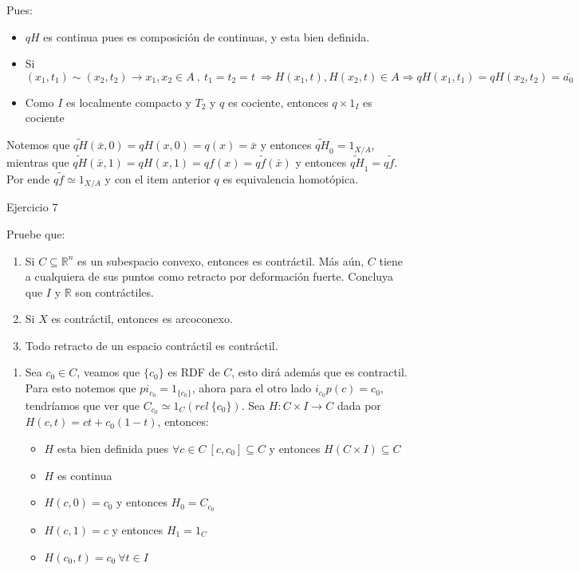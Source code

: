 \documentclass[11pt]{article}
\newcommand{\R}{{\mathbb{R}}}
\newenvironment{proof}[1][Demostraci\'on]{\begin{trivlist}
\item[\hskip \labelsep {\bfseries #1}]}{\end{trivlist}}
\newcommand{\qed}{\nobreak \ifvmode \relax \else
      \ifdim\lastskip<1.5em \hskip-\lastskip
      \hskip1.5em plus0em minus0.5em \fi \nobreak
      \vrule height0.75em width0.5em depth0.25em\fi}
\def \be{\begin{enumerate}}
\def \en{\end{enumerate}}
\begin{document}
\begin{enumerate}
\begin{proof}
\begin{itemize}
Pues:

\begin{itemize}
\item $qH$ es continua pues es composici\'on de continuas, y esta bien definida.
\item Si $(x_1,t_1) \sim (x_2,t_2) \rightarrow x_1,x_2 \in A \ , \ t_1=t_2=t \ \Longrightarrow H(x_1,t),H(x_2,t) \in A \Longrightarrow qH(x_1,t_1)=qH(x_2,t_2)=\bar{a_0} $
\item Como $I$ es localmente compacto y $T_2$ y $q$ es cociente, entonces $q \times 1_I$ es cociente
\end{itemize}

Notemos que $\tilde{qH}(\bar{x},0) = qH(x,0)=q(x) = \bar{x}$ y entonces $\tilde{qH}_0 = 1_{X/A}$, mientras que $\tilde{qH}(\bar{x},1)=qH(x,1)=qf(x)=q\tilde{f}(\bar{x})$ y entonces $\tilde{qH}_1 = q\tilde{f}$. Por ende $q\tilde{f} \simeq 1_{X/A}$ y con el item anterior $q$ es equivalencia homot\'opica. \qed

\end{itemize}


\end{proof}

\item{Ejercicio 7}

Pruebe que: 
\be
 \item Si $C\subseteq \R^ n$ es un subespacio convexo, entonces es contr\'actil. M\'as a\'un, $C$ tiene a cualquiera de
sus puntos como retracto por deformaci\'on fuerte.
 Concluya que $I$ y $\R$ son contr\'actiles.
 
 \item Si $X$ es contr\'actil, entonces es arcoconexo.
 
 \item Todo retracto de un espacio contr\'actil es contr\'actil.
 \en

\begin{proof}

\begin{enumerate}
\item Sea $c_0 \in C$, veamos que $\{c_0\}$ es RDF de $C$, esto dir\'a adem\'as que es contractil. Para esto notemos que $pi_{c_0}=1_{\{c_0\}}$, ahora para el otro lado $i_{c_0}p(c)=c_0$, tendr\'iamos que ver que $C_{c_0} \simeq 1_{C} (rel \ \{c_0\})$. Sea $H:C \times I \rightarrow C$ dada por $H(c,t) = ct + c_0(1-t)$, entonces:

\begin{itemize}
\item $H$ esta bien definida pues $\forall c \in C \ [c,c_0]\subseteq C$ y entonces $H(C \times I) \subseteq C$
\item $H$ es continua
\item $H(c,0) = c_0$ y entonces $H_0 = C_{c_0}$
\item $H(c,1) = c$ y entonces $H_1 = 1_{C}$
\item $H(c_0,t) = c_0 \ \forall t \in I$
\end{itemize}


\end{enumerate}
\end{proof}
\end{enumerate}
\end{document}
